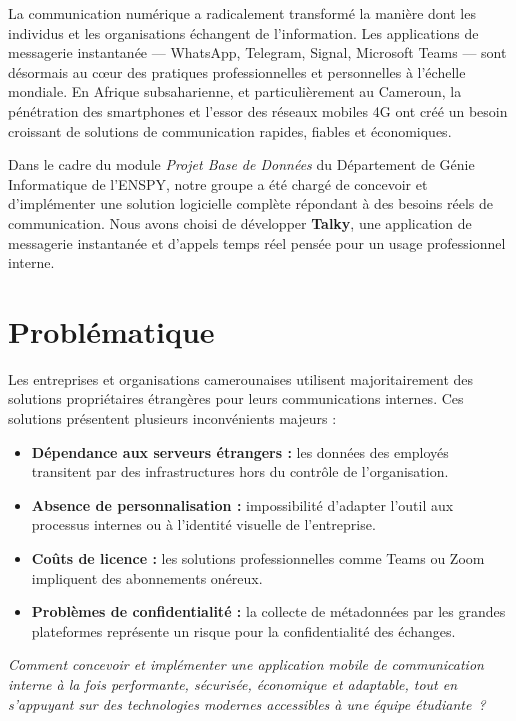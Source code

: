 \documentclass[12pt,a4paper]{report}
\begin{document}
La communication numérique a radicalement transformé la manière dont les individus et les organisations échangent de l'information. Les applications de messagerie instantanée --- WhatsApp, Telegram, Signal, Microsoft Teams --- sont désormais au cœur des pratiques professionnelles et personnelles à l'échelle mondiale. En Afrique subsaharienne, et particulièrement au Cameroun, la pénétration des smartphones et l'essor des réseaux mobiles 4G ont créé un besoin croissant de solutions de communication rapides, fiables et économiques.

Dans le cadre du module \textit{Projet Base de Données} du Département de Génie Informatique de l'ENSPY, notre groupe a été chargé de concevoir et d'implémenter une solution logicielle complète répondant à des besoins réels de communication. Nous avons choisi de développer \textbf{Talky}, une application de messagerie instantanée et d'appels temps réel pensée pour un usage professionnel interne.

\section{Problématique}

Les entreprises et organisations camerounaises utilisent majoritairement des solutions propriétaires étrangères pour leurs communications internes. Ces solutions présentent plusieurs inconvénients majeurs :

\begin{itemize}[leftmargin=1.5cm]
  \item \textbf{Dépendance aux serveurs étrangers :} les données des employés transitent par des infrastructures hors du contrôle de l'organisation.
  \item \textbf{Absence de personnalisation :} impossibilité d'adapter l'outil aux processus internes ou à l'identité visuelle de l'entreprise.
  \item \textbf{Coûts de licence :} les solutions professionnelles comme Teams ou Zoom impliquent des abonnements onéreux.
  \item \textbf{Problèmes de confidentialité :} la collecte de métadonnées par les grandes plateformes représente un risque pour la confidentialité des échanges.
\end{itemize}

\begin{tcolorbox}[colback=ENSPYgray,colframe=ENSPYblue,title={\bfseries\color{white}Question centrale}]
\itshape Comment concevoir et implémenter une application mobile de communication interne à la fois performante, sécurisée, économique et adaptable, tout en s'appuyant sur des technologies modernes accessibles à une équipe étudiante~?
\end{tcolorbox}
\end{document}
